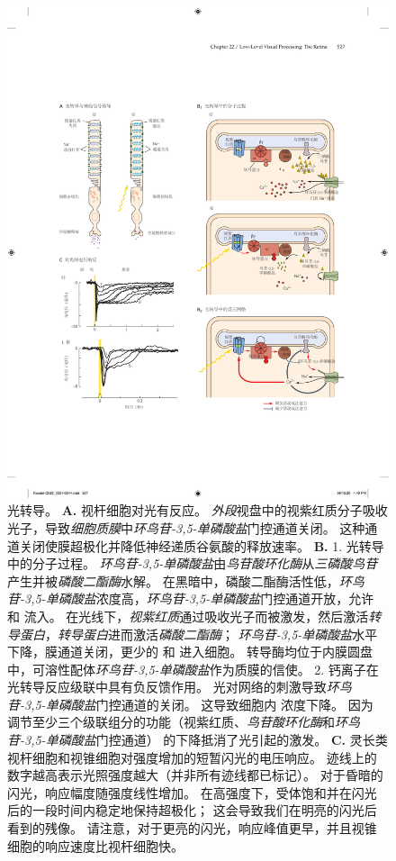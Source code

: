 \begin{figure}[htbp]
	\centering
	\includegraphics[width=1.0\linewidth]{chap22/fig_22_7}
	\caption{光转导。
		\textbf{A.} 视杆细胞对光有反应。
		\textit{外段}视盘中的视紫红质分子吸收光子，导致\textit{细胞质膜}中\textit{环鸟苷-3,5-单磷酸盐}门控通道关闭。
		这种通道关闭使膜超极化并降低神经递质谷氨酸的释放速率\cite{alberts2017molecular}。
		\textbf{B.} 1. 光转导中的分子过程。
		\textit{环鸟苷-3,5-单磷酸盐}由\textit{鸟苷酸环化酶}从\textit{三磷酸鸟苷}产生并被\textit{磷酸二酯酶}水解。
		在黑暗中，磷酸二酯酶活性低，\textit{环鸟苷-3,5-单磷酸盐}浓度高，\textit{环鸟苷-3,5-单磷酸盐}门控通道开放，允许  和  流入。
		在光线下，\textit{视紫红质}通过吸收光子而被激发，然后激活\textit{转导蛋白}，\textit{转导蛋白}进而激活\textit{磷酸二酯酶}；
		\textit{环鸟苷-3,5-单磷酸盐}水平下降，膜通道关闭，更少的  和  进入细胞。
		转导酶均位于内膜圆盘中，可溶性配体\textit{环鸟苷-3,5-单磷酸盐}作为质膜的信使。 
		2. 钙离子在光转导反应级联中具有负反馈作用。
		光对网络的刺激导致\textit{环鸟苷-3,5-单磷酸盐}门控通道的关闭。
		这导致细胞内  浓度下降。
		因为  调节至少三个级联组分的功能（视紫红质、\textit{鸟苷酸环化酶}和\textit{环鸟苷-3,5-单磷酸盐}门控通道） 的下降抵消了光引起的激发。 
		\textbf{C.} 灵长类视杆细胞和视锥细胞对强度增加的短暂闪光的电压响应。
		迹线上的数字越高表示光照强度越大（并非所有迹线都已标记）。 
		对于昏暗的闪光，响应幅度随强度线性增加。 
		在高强度下，受体饱和并在闪光后的一段时间内稳定地保持超极化；
		这会导致我们在明亮的闪光后看到的残像。 
		请注意，对于更亮的闪光，响应峰值更早，并且视锥细胞的响应速度比视杆细胞快\cite{schneeweis1995photovoltage}。}
	\label{fig:22_7}
\end{figure}



